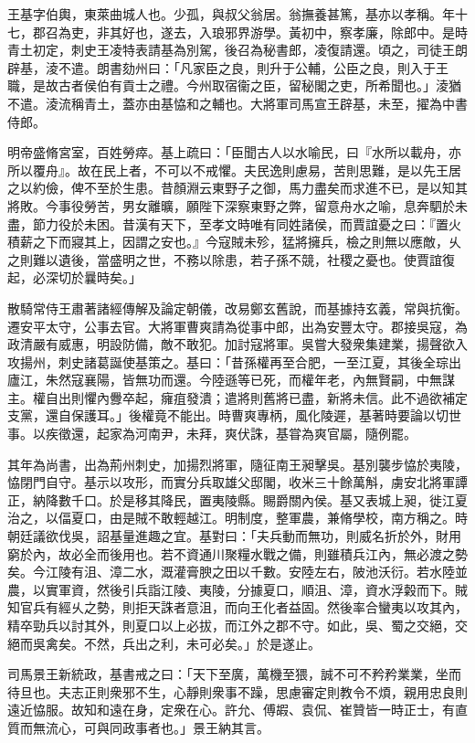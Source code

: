 
\begin{pinyinscope}
王基字伯輿，東萊曲城人也。少孤，與叔父翁居。翁撫養甚篤，基亦以孝稱。年十七，郡召為吏，非其好也，遂去，入琅邪界游學。黃初中，察孝廉，除郎中。是時青土初定，刺史王凌特表請基為別駕，後召為秘書郎，凌復請還。頃之，司徒王朗辟基，淩不遣。朗書劾州曰：「凡家臣之良，則升于公輔，公臣之良，則入于王職，是故古者侯伯有貢士之禮。今州取宿衞之臣，留秘閣之吏，所希聞也。」淩猶不遣。淩流稱青土，蓋亦由基恊和之輔也。大將軍司馬宣王辟基，未至，擢為中書侍郎。

明帝盛脩宮室，百姓勞瘁。基上疏曰：「臣聞古人以水喻民，曰『水所以載舟，亦所以覆舟』。故在民上者，不可以不戒懼。夫民逸則慮易，苦則思難，是以先王居之以約儉，俾不至於生患。昔顏淵云東野子之御，馬力盡矣而求進不已，是以知其將敗。今事役勞苦，男女離曠，願陛下深察東野之弊，留意舟水之喻，息奔駟於未盡，節力役於未困。昔漢有天下，至孝文時唯有同姓諸侯，而賈誼憂之曰：『置火積薪之下而寢其上，因謂之安也。』今寇賊未殄，猛將擁兵，檢之則無以應敵，乆之則難以遺後，當盛明之世，不務以除患，若子孫不競，社稷之憂也。使賈誼復起，必深切於曩時矣。」

散騎常侍王肅著諸經傳解及論定朝儀，改易鄭玄舊說，而基據持玄義，常與抗衡。遷安平太守，公事去官。大將軍曹爽請為從事中郎，出為安豐太守。郡接吳寇，為政清嚴有威惠，明設防備，敵不敢犯。加討寇將軍。吳嘗大發衆集建業，揚聲欲入攻揚州，刺史諸葛誕使基策之。基曰：「昔孫權再至合肥，一至江夏，其後全琮出廬江，朱然寇襄陽，皆無功而還。今陸遜等已死，而權年老，內無賢嗣，中無謀主。權自出則懼內釁卒起，癕疽發潰；遣將則舊將已盡，新將未信。此不過欲補定支黨，還自保護耳。」後權竟不能出。時曹爽專柄，風化陵遲，基著時要論以切世事。以疾徵還，起家為河南尹，未拜，爽伏誅，基甞為爽官屬，隨例罷。

其年為尚書，出為荊州刺史，加揚烈將軍，隨征南王昶擊吳。基別襲步恊於夷陵，恊閉門自守。基示以攻形，而實分兵取雄父邸閣，收米三十餘萬斛，虜安北將軍譚正，納降數千口。於是移其降民，置夷陵縣。賜爵關內侯。基又表城上昶，徙江夏治之，以偪夏口，由是賊不敢輕越江。明制度，整軍農，兼脩學校，南方稱之。時朝廷議欲伐吳，詔基量進趣之宜。基對曰：「夫兵動而無功，則威名折於外，財用窮於內，故必全而後用也。若不資通川聚糧水戰之備，則雖積兵江內，無必渡之勢矣。今江陵有沮、漳二水，溉灌膏腴之田以千數。安陸左右，陂池沃衍。若水陸並農，以實軍資，然後引兵詣江陵、夷陵，分據夏口，順沮、漳，資水浮糓而下。賊知官兵有經乆之勢，則拒天誅者意沮，而向王化者益固。然後率合蠻夷以攻其內，精卒勁兵以討其外，則夏口以上必拔，而江外之郡不守。如此，吳、蜀之交絕，交絕而吳禽矣。不然，兵出之利，未可必矣。」於是遂止。

司馬景王新統政，基書戒之曰：「天下至廣，萬機至猥，誠不可不矜矜業業，坐而待旦也。夫志正則衆邪不生，心靜則衆事不躁，思慮審定則教令不煩，親用忠良則遠近恊服。故知和遠在身，定衆在心。許允、傅嘏、袁侃、崔贊皆一時正士，有直質而無流心，可與同政事者也。」景王納其言。


\end{pinyinscope}
